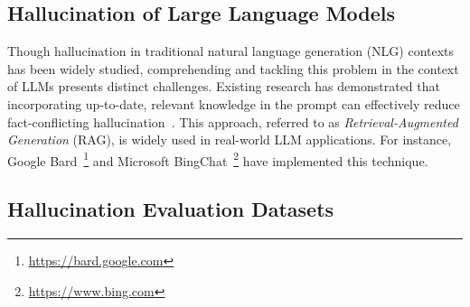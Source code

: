 \documentclass[11pt]{article}
\begin{document}
\subsection{Hallucination of Large Language Models}
Though hallucination in traditional natural language generation (NLG) contexts has been widely studied\cite{10.1145/3571730}, comprehending and tackling this problem in the context of LLMs presents distinct challenges\cite{Zhang2023}.
Existing research has demonstrated that incorporating up-to-date, relevant knowledge in the prompt can effectively reduce fact-conflicting hallucination~\cite{vu2023freshllms, lewis2021retrievalaugmented}. 
This approach,  referred to as {\em Retrieval-Augmented Generation} (RAG), is widely used in real-world LLM applications. 
For instance, Google Bard~\footnote{\url{https://bard.google.com}} and Microsoft BingChat~\footnote{\url{https://www.bing.com}} have implemented this technique. 

\subsection{Hallucination Evaluation Datasets}
\end{document}
